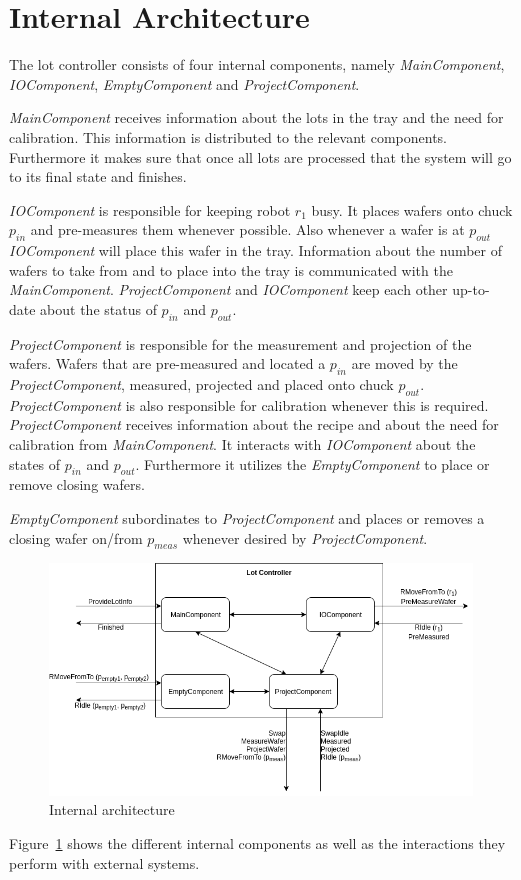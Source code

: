 \section{Internal Architecture}
The lot controller consists of four internal components, namely \textit{MainComponent}, \textit{IOComponent}, \textit{EmptyComponent} and \textit{ProjectComponent}.

\textit{MainComponent} receives information about the lots in the tray and the need for calibration.
This information is distributed to the relevant components.
Furthermore it makes sure that once all lots are processed that the system will go to its final state and finishes.

\textit{IOComponent} is responsible for keeping robot $r_1$ busy.
It places wafers onto chuck $p_\mathit{in}$ and pre-measures them whenever possible.
Also whenever a wafer is at $p_\mathit{out}$ \textit{IOComponent} will place this wafer in the tray.
Information about the number of wafers to take from and to place into the tray is communicated with the \textit{MainComponent}.
\textit{ProjectComponent} and \textit{IOComponent} keep each other up-to-date about the status of $p_\mathit{in}$ and $p_\mathit{out}$.

\textit{ProjectComponent} is responsible for the measurement and projection of the wafers.
Wafers that are pre-measured and located a $p_{in}$ are moved by the \textit{ProjectComponent}, measured, projected and placed onto chuck $p_\mathit{out}$.
\textit{ProjectComponent} is also responsible for calibration whenever this is required.
\textit{ProjectComponent} receives information about the recipe and about the need for calibration from \textit{MainComponent}.
It interacts with \textit{IOComponent} about the states of $p_\mathit{in}$ and $p_\mathit{out}$.
Furthermore it utilizes the \textit{EmptyComponent} to place or remove closing wafers.

\textit{EmptyComponent} subordinates to \textit{ProjectComponent} and places or removes a closing wafer on/from $p_\mathit{meas}$ whenever desired by \textit{ProjectComponent}.

\begin{figure}
    \includegraphics[width=\textwidth]{img/internal_architecture.png}
    \caption{Internal architecture}
    \label{fig:internal_arch}
\end{figure}
Figure~\ref{fig:internal_arch} shows the different internal components as well as the interactions they perform with external systems. 

